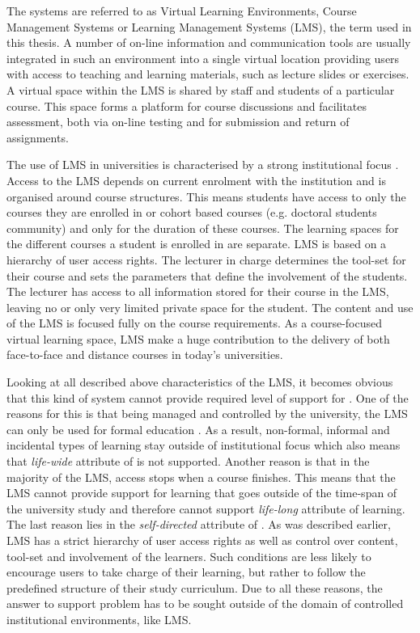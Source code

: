 The systems are referred to as Virtual Learning Environments, Course Management
Systems or Learning Management Systems (LMS), the term used in this thesis. A
number of on-line information and communication tools are usually integrated in
such an environment into a single virtual location \citep{Morgan-Klein2007}
providing users with access to teaching and learning materials, such as lecture
slides or exercises. A virtual space within the LMS is shared by staff and
students of a particular course. This space forms a platform for course
discussions and facilitates assessment, both via on-line testing and for
submission and return of assignments.

The use of LMS in universities is characterised by a strong institutional focus
\citep{Siemens2004}. Access to the LMS depends on current enrolment with the
institution and is organised around course structures. This means students have
access to only the courses they are enrolled in or cohort based courses (e.g.
doctoral students community) and only for the duration of these courses. The
learning spaces for the different courses a student is enrolled in are separate.
LMS is based on a hierarchy of user access rights. The lecturer in charge
determines the tool-set for their course and sets the parameters that define the
involvement of the students. The lecturer has access to all information stored
for their course in the LMS, leaving no or only very limited private space for
the student. The content and use of the LMS is focused fully on the course
requirements. As a course-focused virtual learning space, LMS make a huge
contribution to the delivery of both face-to-face and distance courses in
today's universities.

Looking at all described above characteristics of the LMS, it becomes obvious
that this kind of system cannot provide required level of support for \LLLsn.
One of the reasons for this is that being managed and controlled by the
university, the LMS can only be used for formal education \citep{Venable2011}.
As a result, non-formal, informal and incidental types of learning stay outside
of institutional focus which also means that \textit{life-wide} attribute of
\LLLs is not supported. Another reason is that in the majority of the LMS,
access stops when a course finishes. This means that the LMS cannot provide
support for learning that goes outside of the time-span of the university study
and therefore cannot support \textit{life-long} attribute of learning. The last
reason lies in the \textit{self-directed} attribute of \LLLsn. As was described
earlier, LMS has a strict hierarchy of user access rights as well as control
over content, tool-set and involvement of the learners. Such conditions are
less likely to encourage users to take charge of their learning, but rather to
follow the predefined structure of their study curriculum. Due to all these
reasons, the answer to \LLLs support problem has to be sought outside of the
domain of controlled institutional environments, like LMS.

